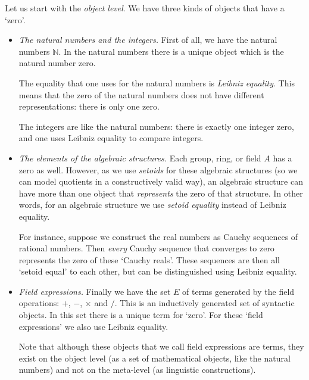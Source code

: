 \documentclass{article}
\newcommand{\nat}{{\mathbb N}}
\begin{document}
Let us start with the \emph{object level}.
We have three kinds of objects that have a `zero'.
\begin{itemize}
\item
\emph{The natural numbers and the integers.}
First of all, we have the natural numbers $\nat$.
In the natural numbers there is a unique object which is the natural number
zero.

The equality that one uses for the natural numbers
is \emph{Leibniz equality}.
This means that the zero of the natural numbers does not have
different representations:
there is only one zero.

The integers are like the natural numbers:
there is exactly one integer zero, and one uses Leibniz equality
to compare integers.

\item
\emph{The elements of the algebraic structures.}
Each group, ring, or field $A$ has a zero as well.
However, as we use \emph{setoids} for these algebraic structures
(so we can model quotients
in a constructively valid way),
an algebraic structure can have more than one object
that \emph{represents} the zero of that structure.
In other words, for an algebraic structure we use \emph{setoid
equality} instead of Leibniz equality.

For instance, suppose we construct the real numbers as Cauchy
sequences of rational numbers.
Then \emph{every} Cauchy sequence that converges to zero represents the
zero of these `Cauchy reals'.
These sequences are then all `setoid equal' to each other, but can
be distinguished using Leibniz equality.

\item
\emph{Field expressions.}
Finally we have the set $E$ of terms generated by the
field operations: $+$, $-$, $\times$ and $/$.
This is an inductively generated set of syntactic objects.
In this set there is a unique term for `zero'.
For these `field expressions' we also use Leibniz equality.

Note that although these objects that we call field expressions
are terms, they exist
on the object level (as a set of mathematical objects, like
the natural numbers)
and not on the meta-level (as linguistic constructions).

\end{itemize}
\end{document}
